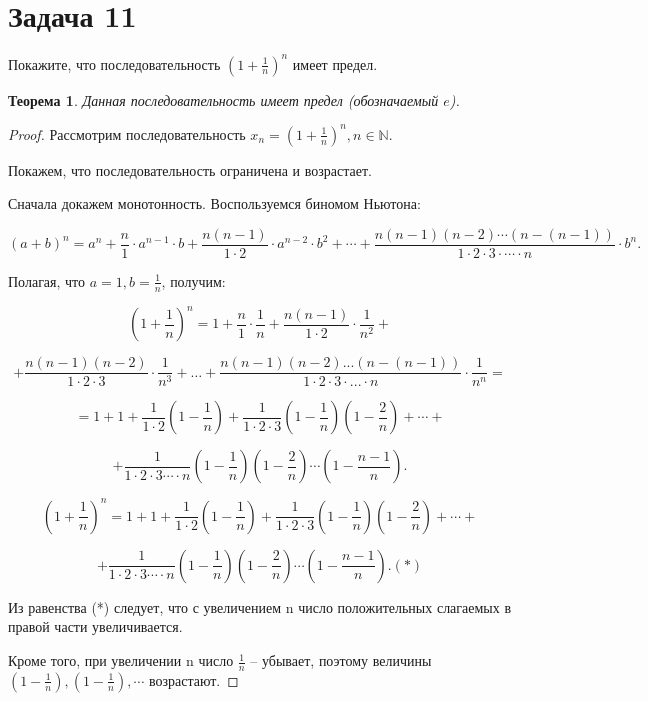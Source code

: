 \documentclass[a4paper,12pt]{article}
\newtheorem*{ther}{Теорема}
\begin{document}
    \section*{Задача 11}

    Покажите, что последовательность $(1 + \frac{1}{n})^n$ имеет предел.

    \begin{ther}
        Данная последовательность имеет предел (обозначаемый $e$).
    \end{ther}

    \begin{proof}
            Рассмотрим последовательность $x_n= (1+\frac{1}{n})^n, n \in \mathbb{N}$.

            Покажем, что последовательность ограничена и возрастает.

            Сначала докажем монотонность. Воспользуемся биномом Ньютона:

            $$(a+b)^n= a^{n}+\frac{n}{1}\cdot a^{n-1}\cdot b+\frac{n (n-1)}{1\cdot 2}\cdot a^{n-2}\cdot b^{2}+ \cdots +\frac{n (n-1) (n-2)\cdots (n- (n-1))}{1\cdot 2\cdot 3\cdot \cdots \cdot n}\cdot b^{n}.$$

            Полагая, что  $a= 1, b= \frac{1}{n}$,  получим:

            $$(1+\frac{1}{n})^{n}= 1+\frac{n}{1}\cdot \frac{1}{n}+\frac{n (n-1)}{1\cdot 2}\cdot \frac{1}{n^{2}}+$$

            $$+\frac{n (n-1) (n-2)}{1\cdot 2\cdot 3}\cdot \frac{1}{n^{3}}+ \ldots + \frac{n (n-1) (n-2)... (n- (n-1))}{1\cdot 2\cdot 3\cdot ...\cdot n}\cdot \frac{1}{n^{n}}= $$

            $$= 1+1+\frac{1}{1\cdot 2} (1-\frac{1}{n})+\frac{1}{1\cdot 2\cdot 3} (1-\frac{1}{n}) (1-\frac{2}{n})+\cdots + $$

            $$+\frac{1}{1\cdot 2\cdot 3\cdots \cdot n} (1-\frac{1}{n}) (1-\frac{2}{n})\cdots (1-\frac{n-1}{n}).$$

            $$(1+\frac{1}{n})^{n}= 1+1+\frac{1}{1\cdot 2} (1-\frac{1}{n})+\frac{1}{1\cdot 2\cdot 3} (1-\frac{1}{n}) (1-\frac{2}{n})+ \cdots + $$

            $$+ \frac{1}{1\cdot 2\cdot 3\cdots\cdot n} (1-\frac{1}{n}) (1-\frac{2}{n})\cdots (1-\frac{n-1}{n}). (*)$$

            Из равенства (*) следует, что с увеличением n  число положительных слагаемых в правой части увеличивается.

            Кроме того, при увеличении n число $\frac{1}{n}$ – убывает,
            поэтому величины $(1-\frac{1}{n}), (1-\frac{1}{n}), \cdots$ возрастают.


\end{proof}
\end{document}
